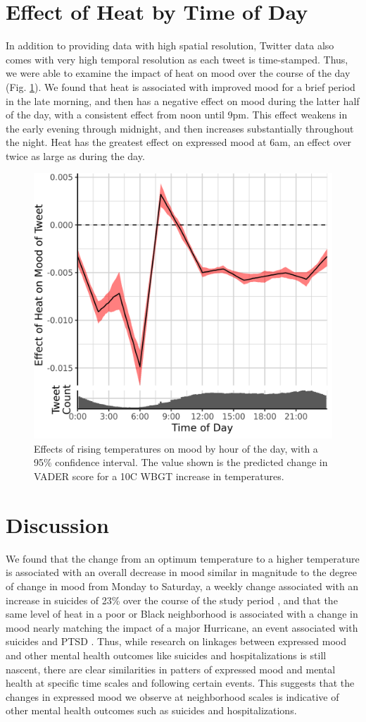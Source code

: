 \documentclass[fleqn,10pt]{wlscirep}
\begin{document}
\section*{Effect of Heat by Time of Day}
In addition to providing data with high spatial resolution, Twitter data also comes with very high temporal resolution as each tweet is time-stamped. Thus, we were able to examine the impact of heat on mood over the course of the day (Fig. \ref{fig:ts-wbgt}). We found that heat is associated with improved mood for a brief period in the late morning, and then has a negative effect on mood during the latter half of the day, with a consistent effect from noon until 9pm. This effect weakens in the early evening through midnight, and then increases substantially throughout the night. Heat has the greatest effect on expressed mood at 6am, an effect over twice as large as during the day.

\begin{figure}[H]
 \centering
 \includegraphics[width=0.5\linewidth]{../res/ts_heat.png}
 \caption{Effects of rising temperatures on mood by hour of the day, with a 95\% confidence interval. The value shown is the predicted change in VADER score for a 10\textdegree C WBGT increase in temperatures.}
 \label{fig:ts-wbgt}
\end{figure}

\section*{Discussion}
We found that the change from an optimum temperature to a higher temperature is associated with an overall decrease in mood similar in magnitude to the degree of change in mood from Monday to Saturday, a weekly change associated with an increase in suicides of 23\% over the course of the study period \cite{CDC2021}, and that the same level of heat in a poor or Black neighborhood is associated with a change in mood nearly matching the impact of a major Hurricane, an event associated with suicides and PTSD \cite{Schwartz2017Aug, Lieberman-Cribbin2017}.  Thus, while research on linkages between expressed mood and other mental health outcomes like suicides and hospitalizations is still nascent, there are clear similarities in patters of expressed mood and mental health at specific time scales and following certain events.  This suggests that the changes in expressed mood we observe at neighborhood scales is indicative of other mental health outcomes such as suicides and hospitalizations.
\end{document}
